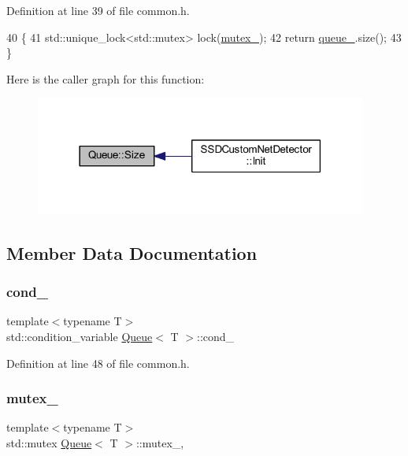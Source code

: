 Definition at line 39 of file common.\+h.


\begin{DoxyCode}
40     \{
41         std::unique\_lock<std::mutex> lock(\mbox{\hyperlink{class_queue_ad341bfdf4d075ed6ab4807da10e703cd}{mutex\_}});
42         \textcolor{keywordflow}{return} \mbox{\hyperlink{class_queue_a60e7a5aba900b055cd0668755c0dfadd}{queue\_}}.size();
43     \}
\end{DoxyCode}
Here is the caller graph for this function\+:\nopagebreak
\begin{figure}[H]
\begin{center}
\leavevmode
\includegraphics[width=309pt]{class_queue_a5e59f2b97d5dea8ad0314b6239816055_icgraph}
\end{center}
\end{figure}


\subsection{Member Data Documentation}
\mbox{\label{class_queue_aeb109ed25687457524a70b03a2584b6d}} 
\subsubsection{\texorpdfstring{cond\+\_\+}{cond\_}}
{\footnotesize\ttfamily template$<$typename T$>$ \\
std\+::condition\+\_\+variable \mbox{\hyperlink{class_queue}{Queue}}$<$ T $>$\+::cond\+\_\+\hspace{0.3cm}{\ttfamily [private]}}



Definition at line 48 of file common.\+h.

\mbox{\label{class_queue_ad341bfdf4d075ed6ab4807da10e703cd}} 
\subsubsection{\texorpdfstring{mutex\+\_\+}{mutex\_}}
{\footnotesize\ttfamily template$<$typename T$>$ \\
std\+::mutex \mbox{\hyperlink{class_queue}{Queue}}$<$ T $>$\+::mutex\+\_\+\hspace{0.3cm}{\ttfamily [mutable]}, {\ttfamily [private]}}



